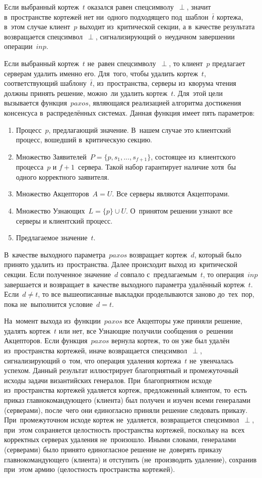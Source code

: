 Если выбранный кортеж~$t$ оказался равен спецсимволу~$\perp$, значит в~пространстве кортежей нет ни~одного подходящего под~шаблон~$\bar t$ кортежа, в~этом случае клиент~$p$ выходит из~критической секции, а в~качестве результата возвращается спецсимвол~$\perp$, сигнализирующий о~неудачном завершении операции~$inp$.

Если выбранный кортеж~$t$ не~равен спецсимволу~$\perp$, то клиент~$p$ предлагает серверам удалить именно его. Для~того, чтобы удалить кортеж~$t$, соответствующий шаблону~$\bar{t}$, из~пространства, серверы из~кворума чтения должны принять решение, можно~ли удалить кортеж~$t$. Для~этой цели вызывается функция~$paxos$, являющаяся реализацией алгоритма достижения консенсуса в~распределённых системах. Данная функция имеет пять параметров: 
\begin{enumerate}
	\item Процесс~$p$, предлагающий значение. В~нашем случае это клиентский процесс, вошедший в~критическую секцию.
	\item Множество Заявителей~$P = \{p, s_1, ..., s_{f+1}\}$, состоящее из~клиентского процесса~$p$ и $f + 1$~сервера. Такой набор гарантирует наличие хотя~бы одного корректного заявителя.
	\item Множество Акцепторов~$A = U$. Все серверы являются Акцепторами.
	\item Множество Узнающих~$L = \{p\} \cup U$. О~принятом решении узнают все серверы и клиентский процесс.
	\item Предлагаемое значение~$t$.
\end{enumerate}

В~качестве выходного параметра~$paxos$ возвращает кортеж~$d$, который было принято удалить из~пространства. Далее происходит выход из~критической секции. Если полученное значение~$d$ совпало с~предлагаемым~$t$, то операция~$inp$ завершается и возвращает в~качестве выходного параметра удалённый кортеж~$t$. Если~$d \ne t$, то все вышеописанные выкладки проделываются заново до~тех~пор, пока не~выполнится условие~$d = t$.

На~момент выхода из~функции~$paxos$ все Акцепторы уже приняли решение, удалять кортеж~$t$ или нет, все Узнающие получили сообщения о~решении Акцепторов. Если функция~$paxos$ вернула кортеж, то он уже был удалён из~пространства кортежей, иначе возвращается спецсимвол~$\perp$, сигнализирующий о~том, что операция удаления кортежа~$t$ не~увенчалась успехом. Данный результат иллюстрирует благоприятный и промежуточный исходы задачи византийских генералов. При~благоприятном исходе из~пространства кортежей удаляется кортеж, предложенный клиентом, то~есть приказ главнокомандующего (клиента) был получен и изучен всеми генералами (серверами), после~чего они единогласно приняли решение следовать приказу. При~промежуточном исходе кортеж не~удаляется, возвращается спецсимвол~$\perp$, при~этом сохраняется целостность пространства кортежей, поскольку на~всех корректных серверах удаления не~произошло. Иными словами, генералами (серверами) было принято единогласное решение не~доверять приказу главнокомандующего (клиента) и отступить (не~производить удаление), сохранив при~этом армию (целостность пространства кортежей).

